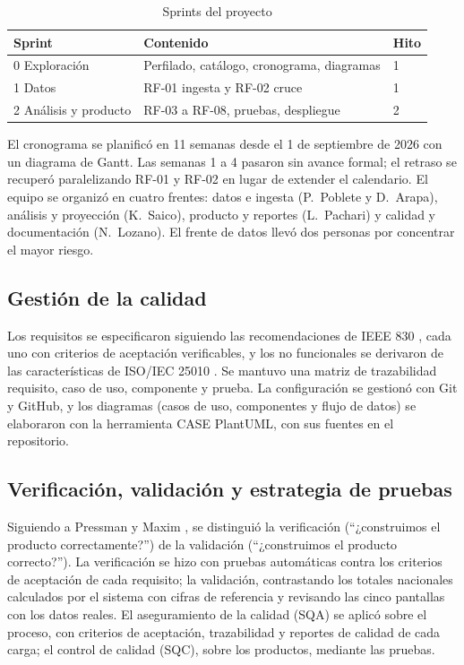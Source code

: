 \documentclass[conference]{IEEEtran}
\begin{document}
\begin{table}[t]
\caption{Sprints del proyecto}\label{tab:sprints}
\centering
\begin{tabular}{@{}lll@{}}
\toprule
Sprint & Contenido & Hito \\
\midrule
0 Exploración & Perfilado, catálogo, cronograma, diagramas & 1 \\
1 Datos & RF-01 ingesta y RF-02 cruce & 1 \\
2 Análisis y producto & RF-03 a RF-08, pruebas, despliegue & 2 \\
\bottomrule
\end{tabular}
\end{table}

El cronograma se planificó en 11 semanas desde el 1 de septiembre de 2026 con un diagrama de Gantt. Las semanas 1 a 4 pasaron sin avance formal; el retraso se recuperó paralelizando RF-01 y RF-02 en lugar de extender el calendario. El equipo se organizó en cuatro frentes: datos e ingesta (P.~Poblete y D.~Arapa), análisis y proyección (K.~Saico), producto y reportes (L.~Pachari) y calidad y documentación (N.~Lozano). El frente de datos llevó dos personas por concentrar el mayor riesgo.

\subsection{Gestión de la calidad}
Los requisitos se especificaron siguiendo las recomendaciones de IEEE 830 \cite{ieee830}, cada uno con criterios de aceptación verificables, y los no funcionales se derivaron de las características de ISO/IEC 25010 \cite{iso25010}. Se mantuvo una matriz de trazabilidad requisito, caso de uso, componente y prueba. La configuración se gestionó con Git y GitHub, y los diagramas (casos de uso, componentes y flujo de datos) se elaboraron con la herramienta CASE PlantUML, con sus fuentes en el repositorio.

\subsection{Verificación, validación y estrategia de pruebas}
Siguiendo a Pressman y Maxim \cite{pressman2020}, se distinguió la verificación (``¿construimos el producto correctamente?'') de la validación (``¿construimos el producto correcto?''). La verificación se hizo con pruebas automáticas contra los criterios de aceptación de cada requisito; la validación, contrastando los totales nacionales calculados por el sistema con cifras de referencia y revisando las cinco pantallas con los datos reales. El aseguramiento de la calidad (SQA) se aplicó sobre el proceso, con criterios de aceptación, trazabilidad y reportes de calidad de cada carga; el control de calidad (SQC), sobre los productos, mediante las pruebas.
\end{document}
